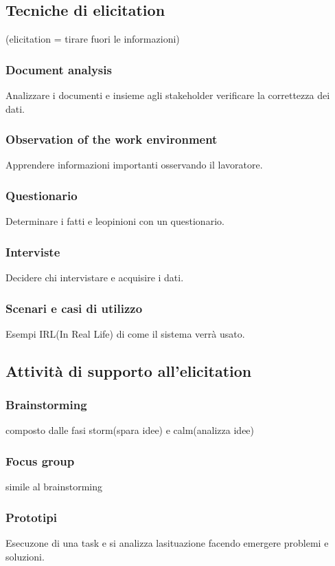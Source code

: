 \documentclass{article}
\begin{document}
\subsection{Tecniche di elicitation}
(elicitation = tirare fuori le informazioni)
\subsubsection{Document analysis}

Analizzare i documenti e insieme agli stakeholder verificare la correttezza dei dati.

\subsubsection{Observation of the work environment}
Apprendere informazioni importanti osservando il lavoratore.
\subsubsection{Questionario}
Determinare i fatti e leopinioni con un questionario.
\subsubsection{Interviste}
Decidere chi intervistare e acquisire i dati.
\subsubsection{Scenari e casi di utilizzo}
Esempi IRL(In Real Life) di come il sistema verrà usato.

\subsection{Attività di supporto all'elicitation}
\subsubsection{Brainstorming}
composto dalle fasi storm(spara idee) e calm(analizza idee)
\subsubsection{Focus group}
simile al brainstorming
\subsubsection{Prototipi}
Esecuzone di una task e si analizza lasituazione facendo emergere problemi
e soluzioni.
\end{document}
